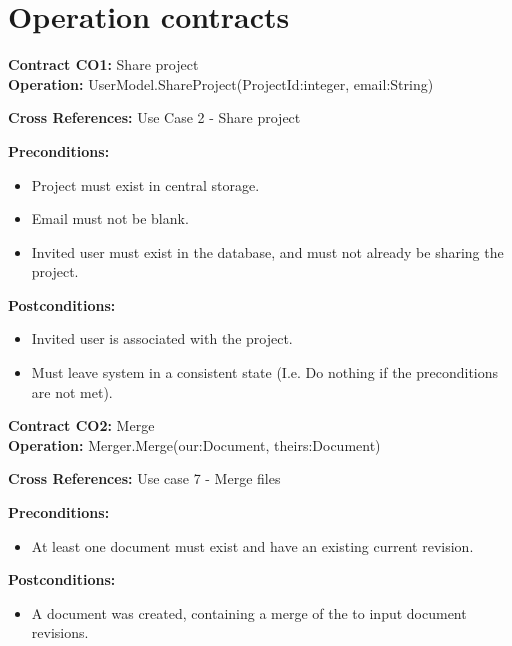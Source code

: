 \section{Operation contracts}
\label{sec:operation-contracts}

\textbf{Contract CO1:} Share project \\

\textbf{Operation:} UserModel.ShareProject(ProjectId:integer, email:String)

\textbf{Cross References:} Use Case 2 - Share project

\textbf{Preconditions:} 

\begin{itemize}

    \item Project must exist in central storage.

    \item Email must not be blank.

    \item Invited user must exist in the database, and must not already be sharing the project.

\end{itemize}

\textbf{Postconditions:}

\begin{itemize}

    \item Invited user is associated with the project.

    \item Must leave system in a consistent state (I.e. Do nothing if the preconditions are not met).

\end{itemize}


\noindent \textbf{Contract CO2:} Merge \\

\textbf{Operation:} Merger.Merge(our:Document, theirs:Document)

\textbf{Cross References:} Use case 7 - Merge files

\textbf{Preconditions:}

\begin{itemize}
    \item At least one document must exist and have an existing current revision.
\end{itemize}

\textbf{Postconditions:}

\begin{itemize}
    \item A document was created, containing a merge of the to input document revisions.
\end{itemize}
